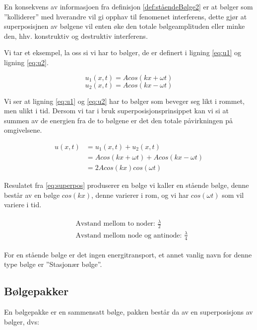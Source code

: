 En konsekvens av informasjoen fra definisjon \ref{def:ståendeBølge2} er at bølger som ''kolliderer'' med hverandre vil gi opphav til fenomenet interferens, dette gjør at superposisjnen av bølgene vil enten øke den totale bølgeamplituden eller minke den, hhv. konstruktiv og destruktiv interferens. 

Vi tar et eksempel, la oss si vi har to bølger, de er definert i ligning \ref{eq:u1} og ligning \ref{eq:u2}.

\begin{equation}
    \label{eq:u1}
    u_1(x,t) = Acos(kx+\omega t)
\end{equation}
\begin{equation}
    \label{eq:u2}
    u_2(x,t) = Acos(kx-\omega t)
\end{equation}

Vi ser at ligning \ref{eq:u1} og \ref{eq:u2} har to bølger som beveger seg likt i rommet, men ulikt i tid. Dersom vi tar i bruk superposisjonsprinsippet kan vi si at summen av de energien fra de to bølgene er det den totale påvirkningen på omgivelsene.

\begin{equation}
    \label{eq:superpos}
    \begin{split}
        u(x,t) &= u_1(x,t) + u_2(x,t)\\
        &= Acos(kx+\omega t) + Acos(kx-\omega t)\\
        &= 2A cos(kx) cos(\omega t)
    \end{split}
\end{equation}

Resulatet fra \autoref{eq:superpos} produserer en bølge vi kaller en stående bølge, denne består av en bølge $cos(kx)$, denne varierer i rom, og vi har $cos(\omega t)$ som vil variere i tid.

\begin{gather*}
    \begin{split}
    &\text{Avstand mellom to noder: $\frac{\lambda}{2}$}\\
    &\text{Avstand mellom node og antinode: $\frac{\lambda}{4}$}
    \end{split}
\end{gather*}

For en stående bølge er det ingen energitransport, et annet vanlig navn for denne type bølge er ''Stasjonær bølge''.
\newpage

\subsection{Bølgepakker}
\label{sec:tema1_5}
En bølgepakke er en sammensatt bølge, pakken består da av en superposisjons av bølger, dvs:

